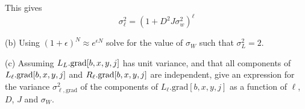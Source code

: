 \documentclass{article}
\newcommand{\solution}[1]{}
\begin{document}
{{This gives
$$\sigma^2_\ell = (1 + D^2J\sigma^2_w)^\ell$$
} 

\medskip
(b) Using $(1+\epsilon)^N \approx e^{\epsilon N}$ solve for the value of $\sigma_W$ such that $\sigma^2_L = 2$.

\solution{

\begin{eqnarray*}
\sigma^2_L & = & (1 + D^2J\sigma^2_w)^L \\
\\
& \approx & e^{LD^2J\sigma_W^2}
\end{eqnarray*}

setting
$$e^{LD^2J\sigma_W^2} = 2$$
gives
$$\sigma_w \approx \sqrt{\frac{\ln 2}{LD^2J}}$$
}

\medskip
(c) Assuming $L_L.\mathrm{grad}[b,x,y,j]$ has unit variance, and that all components of $L_\ell.\mathrm{grad}[b,x,y,j]$ and $R_\ell.\mathrm{grad}[b,x,y,j]$ are independent,
give an expression for the variance
$\sigma^2_{\ell,\mathrm{grad}}$ of the components of $L_\ell.\mathrm{grad}[b,x,y,j]$ as a function of $\ell$, $D$, $J$ and $\sigma_W$.

\solution{
The code we are concerned with is
\begin{eqnarray*}
  \mathrm{for}\;b,x,y,j\Delta x,\Delta y,j' \\
  \;\;\;  R_{\ell+1}[b,x,y,j] & \pluseq & W_{\ell+1}[\Delta x, \Delta y, j',j]\; L_{\ell}[b,x + \Delta x, y + \Delta y, j'] \\
  \\
  \mathrm{for}\;b,x,y,j \;\;\;\;\;\;\;\;\;\;\;\\    \;\;\;  R_{\ell+1}[b,x,y,j] & \minuseq & B_{\ell+1}[j] \\
  \\
  \mathrm{for}\;b,x,y,j\;\;\;\;\;\;\;\;\;\;\;\;\\
  L_{\ell+1}[b,x,y,j] & = & L_{\ell}[b,x,y,j] + R_{\ell+1}[b,x,y,j]
\end{eqnarray*}

The backpropagation program includes

\begin{eqnarray*}
  \mathrm{for}\;b,x,y,j\;\;\;\;\;\;\;\;\;\;\;\;\\
  R_{\ell+1}.\grad [b,x,y,j] & = & L_{\ell+1}[b,x,y,j].\grad \\
  L_{\ell}.\grad [b,x,y,j] & \pluseq & L_{\ell+1}[b,x,y,j].\grad \\
  \\
  \mathrm{for}\;b,x,y,j\Delta x,\Delta y,j'\;\;\;\;\;\;\;\;\;\;\; \\
  \;\;\;  L_{\ell}.\grad[b,x + \Delta x, y + \Delta y, j'] & \pluseq & R_{\ell+1}.\grad[b,x,y,j] W_{\ell+1}[\Delta x, \Delta y, j',j]\;  \\
  \\
\end{eqnarray*}

}}
\end{document}
